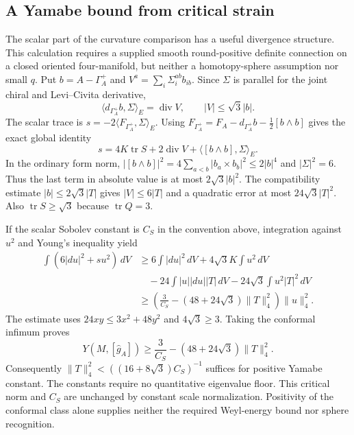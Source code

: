 \documentclass[11pt]{article}
\numberwithin{equation}{section}
\theoremstyle{definition}
\theoremstyle{remark}
\begin{document}
\subsection{A Yamabe bound from critical strain}
\label{subsec:strain-yamabe}

The scalar part of the curvature comparison has a useful divergence
structure. This calculation requires a supplied smooth round-positive
definite connection on a closed oriented four-manifold, but neither
a homotopy-sphere assumption nor small $q$. Put $b=A-\Gamma_A^+$ and
$V^a=\sum_i\Sigma_i^{ab}b_{ib}$. Since $\Sigma$ is parallel for the
joint chiral and Levi--Civita derivative,
\[
 \langle d_{\Gamma_A^+}b,\Sigma\rangle_E=\operatorname{div}V,
 \qquad |V|\le\sqrt3|b|.
\]
The scalar trace is
$s=-2\langle F_{\Gamma_A^+},\Sigma\rangle_E$. Using
$F_{\Gamma_A^+}=F_A-d_{\Gamma_A^+}b-\tfrac12[b\wedge b]$ gives
the exact global identity
\begin{equation}\label{eq:scalar-divergence}
 s=4K\operatorname{tr}S+2\operatorname{div}V
                   +\langle[b\wedge b],\Sigma\rangle_E.
\end{equation}
In the ordinary form norm,
$|[b\wedge b]|^2=4\sum_{a<b}|b_a\times b_b|^2\le2|b|^4$
and $|\Sigma|^2=6$. Thus the last term in absolute value
is at most $2\sqrt3|b|^2$. The compatibility estimate
$|b|\le2\sqrt3|T|$ gives $|V|\le6|T|$ and a quadratic error
at most $24\sqrt3|T|^2$. Also $\operatorname{tr}S\ge\sqrt3$
because $\operatorname{tr}Q=3$.

If the scalar Sobolev constant is $C_S$ in the convention above,
integration against $u^2$ and Young's inequality yield
\begin{align*}
 \int(6|du|^2+su^2)\,dV
 &\ge 6\int|du|^2\,dV+4\sqrt3K\int u^2\,dV\\
 &\quad-24\int|u||du||T|\,dV
             -24\sqrt3\int u^2|T|^2\,dV\\
 &\ge\left(\frac3{C_S}-(48+24\sqrt3)\|T\|_4^2\right)\|u\|_4^2.
\end{align*}
The estimate uses $24xy\le3x^2+48y^2$ and $4\sqrt3\ge3$.
Taking the conformal infimum proves
\begin{equation}\label{eq:strain-yamabe}
 Y(M,[\widehat g_A])\ge
 \frac3{C_S}-(48+24\sqrt3)\|T\|_4^2.
\end{equation}
Consequently $\|T\|_4^2<((16+8\sqrt3)C_S)^{-1}$ suffices
for positive Yamabe constant. The constants require no quantitative
eigenvalue floor. This critical norm and $C_S$ are unchanged by
constant scale normalization. Positivity of the conformal class
alone supplies neither the required Weyl-energy bound nor sphere
recognition.
\end{document}

